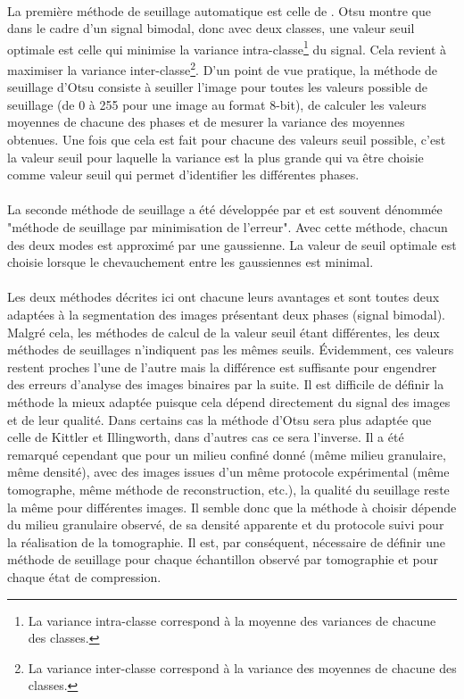 			\paragraph{}La première méthode de seuillage automatique est celle de \citet{otsu_threshold_1979}. Otsu montre que dans le cadre d'un signal bimodal, donc avec deux classes, une valeur seuil optimale est celle qui minimise la variance intra-classe\footnote{La variance intra-classe correspond à la moyenne des variances de chacune des classes.} du signal. Cela revient à maximiser la variance inter-classe\footnote{La variance inter-classe correspond à la variance des moyennes de chacune des classes.}. D'un point de vue pratique, la méthode de seuillage d'Otsu consiste à seuiller l'image pour toutes les valeurs possible de seuillage (de \num{0} à \num{255} pour une image au format 8-bit), de calculer les valeurs moyennes de chacune des phases et de mesurer la variance des moyennes obtenues. Une fois que cela est fait pour chacune des valeurs seuil possible, c'est la valeur seuil pour laquelle la variance est la plus grande qui va être choisie comme valeur seuil qui permet d'identifier les différentes phases.
			\paragraph{}La seconde méthode de seuillage a été développée par \citet{kittler_minimum_1986} et est souvent dénommée "méthode de seuillage par minimisation de l'erreur". Avec cette méthode, chacun des deux modes est approximé par une gaussienne. La valeur de seuil optimale est choisie lorsque le chevauchement entre les gaussiennes est minimal.
			\paragraph{}Les deux méthodes décrites ici ont chacune leurs avantages et sont toutes deux adaptées à la segmentation des images présentant deux phases (signal bimodal). Malgré cela, les méthodes de calcul de la valeur seuil étant différentes, les deux méthodes de seuillages n'indiquent pas les mêmes seuils. \'Evidemment, ces valeurs restent proches l'une de l'autre mais la différence est suffisante pour engendrer des erreurs d'analyse des images binaires par la suite. Il est difficile de définir la méthode la mieux adaptée puisque cela dépend directement du signal des images et de leur qualité. Dans certains cas la méthode d'Otsu sera plus adaptée que celle de Kittler et Illingworth, dans d'autres cas ce sera l'inverse. Il a été remarqué cependant que pour un milieu confiné donné (même milieu granulaire, même densité), avec des images issues d'un même protocole expérimental (même tomographe, même méthode de reconstruction, etc.), la qualité du seuillage reste la même pour différentes images. Il semble donc que la méthode à choisir dépende du milieu granulaire observé, de sa densité apparente et du protocole suivi pour la réalisation de la tomographie. Il est, par conséquent, nécessaire de définir une méthode de seuillage pour chaque échantillon observé par tomographie et pour chaque état de compression.
